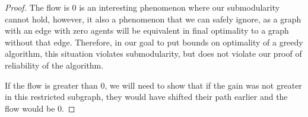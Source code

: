 \documentclass[a4paper,12pt]{article}
\begin{document}
\begin{proof}
The flow is 0 is an interesting phenomenon where our submodularity cannot hold, however, it also a phenomenon that we can safely ignore, as a graph with an edge with zero agents will be equivalent in final optimality to a graph without that edge. Therefore, in our goal to put bounds on optimality of a greedy algorithm, this situation violates submodularity, but does not violate our proof of reliability of the algorithm.

If the flow is greater than 0, we will need to show that if the gain was not greater in this restricted subgraph, they would have shifted their path earlier and the flow would be 0.


\end{proof}



\printbibliography
\end{document}
